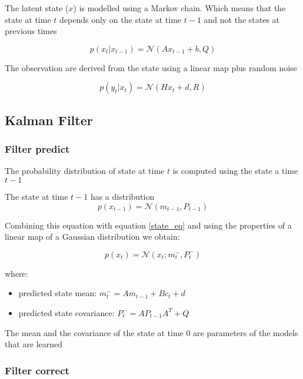 \documentclass{article}
\begin{document}
The latent state ($x$) is modelled using a Markov chain. Which means that the state at time $t$ depends only on the state at time $t-1$ and not the states at previous times

\begin{equation}\label{state_eq}
p(x_t | x_{t-1}) = \mathcal{N}(Ax_{t-1} + b, Q)
\end{equation}

The observation are derived from the state using a linear map plus random noise

\begin{equation}\label{obs_from_state}
    p(y_t | x_t) = \mathcal{N}(Hx_t + d, R)
\end{equation}

\subsection{Kalman Filter}

\subsubsection{Filter predict}

The probability distribution of state at time $t$ is computed using the state a time $t-1$

The state at time $t-1$ has a distribution $$ p(x_{t-1}) = \mathcal{N}(m_{t-1}, P_{t-1}) $$ 

Combining this equation with equation \ref{state_eq} and using the properties of a linear map of a Gaussian distribution we obtain:

\begin{equation}
    \label{filter_predict}p(x_t) = \mathcal{N}(x_t; m_t^-, P_t^-)
\end{equation} 

where:
\begin{itemize}
    \item predicted state mean: $m_t^- = Am_{t-1} + B c_t + d$   
    \item predicted state covariance: $P_t^- = AP_{t-1}A^T + Q$
\end{itemize}

The mean and the covariance of the state at time $0$ are parameters of the models that are learned

\subsubsection{Filter correct}
\end{document}
